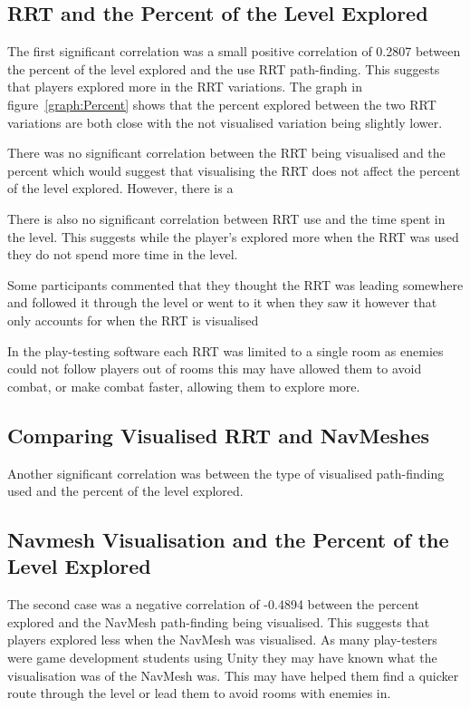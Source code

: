 \documentclass[journal]{IEEEtran}
\begin{document}
	\subsection{RRT and the Percent of the Level Explored}
	
	The first significant correlation was a small positive correlation of 0.2807 between the percent of the level explored and the use RRT path-finding. This suggests that players explored more in the RRT variations. 	
	The graph in figure~\ref{graph:Percent} shows that the percent explored between the two RRT variations are both close with the not visualised variation being slightly lower. 
	
	There was no significant correlation between the RRT being visualised and the percent which would suggest that visualising the RRT does not affect the percent of the level explored. However, there is a 
	
	 There is also no significant correlation between RRT use and the time spent in the level. This suggests while the player's explored more when the RRT was used they do not spend more time in the level.  
	
	Some participants commented that they thought the RRT was leading somewhere and followed it through the level or went to it when they saw it however that only accounts for when the RRT is visualised
	
	In the play-testing software each RRT was limited to a single room as enemies could not follow players out of rooms this may have allowed them to avoid combat, or make combat faster, allowing them to explore more. 
	
	\subsection{Comparing Visualised RRT and NavMeshes}
	Another significant correlation was between the type of visualised path-finding used and the percent of the level explored. 
	
	\subsection{Navmesh Visualisation and the Percent of the Level Explored}
	
	The second case was a negative correlation of -0.4894 between the percent explored and the NavMesh path-finding being visualised. This suggests that players explored less when the NavMesh was visualised.  As many play-testers were game development students using Unity they may have known what the visualisation was of the NavMesh was. This may have helped them find a quicker route through the level or lead them to avoid rooms with enemies in.
	
\end{document}
